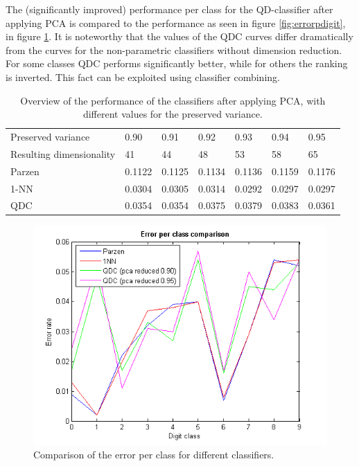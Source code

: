 The (significantly improved) performance per class for the QD-classifier after applying PCA is compared to the performance as seen in figure \ref{fig:errorpdigit}, in figure \ref{fig:errorpdigit2}. It is noteworthy that the values of the QDC curves differ dramatically from the curves for the non-parametric classifiers without dimension reduction. For some classes QDC performs significantly better, while for others the ranking is inverted. This fact can be exploited using classifier combining.
\begin{table}[H]
	\centering
	\caption{Overview of the performance of the classifiers after applying PCA, with different values for the preserved variance.}
	\label{tab:PCA}
	\begin{tabular}{l|llllll}
		Preserved variance       & 0.90   & 0.91   & 0.92   & 0.93   & 0.94   & 0.95   \\
		Resulting dimensionality & 41     & 44     & 48     & 53     & 58     & 65     \\ \hline
		Parzen                   & 0.1122 & 0.1125 & 0.1134 & 0.1136 & 0.1159 & 0.1176 \\
		1-NN                     & 0.0304 & 0.0305 & 0.0314 & 0.0292 & 0.0297 & 0.0297 \\
		QDC                      & 0.0354 & 0.0354 & 0.0375 & 0.0379 & 0.0383 & 0.0361
	\end{tabular}
\end{table}
\begin{figure}[H]
	\centering
	\includegraphics[scale=0.8]{images/pr_figure_3.png}
	\caption{Comparison of the error per class for different classifiers.}
	\label{fig:errorpdigit2}
\end{figure}
